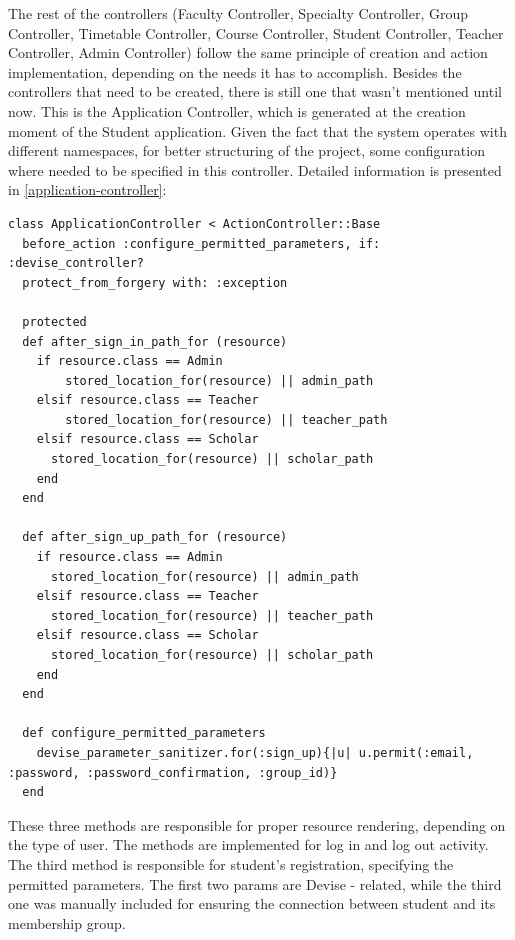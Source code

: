 The rest of the controllers (Faculty Controller, Specialty Controller, Group Controller, Timetable Controller, Course Controller, Student Controller, Teacher Controller, Admin Controller) follow the same principle of creation and action implementation, depending on the needs it has to accomplish. Besides the controllers that need to be created, there is still one that wasn't mentioned until now. This is the Application Controller, which is generated at the creation moment of the Student application. Given the fact that the system operates with different namespaces, for better structuring of the project, some configuration where needed to be specified in this controller. Detailed information is presented in \autoref{application-controller}:

\begin{lstlisting}[caption={Content of Application Controller},label={application-controller}]
class ApplicationController < ActionController::Base
  before_action :configure_permitted_parameters, if: :devise_controller?
  protect_from_forgery with: :exception

  protected
  def after_sign_in_path_for (resource)
  	if resource.class == Admin 
  		stored_location_for(resource) || admin_path
  	elsif resource.class == Teacher
  		stored_location_for(resource) || teacher_path	
    elsif resource.class == Scholar
      stored_location_for(resource) || scholar_path 
    end
  end

  def after_sign_up_path_for (resource)
    if resource.class == Admin 
      stored_location_for(resource) || admin_path
    elsif resource.class == Teacher
      stored_location_for(resource) || teacher_path
    elsif resource.class == Scholar
      stored_location_for(resource) || scholar_path 
    end
  end

  def configure_permitted_parameters
    devise_parameter_sanitizer.for(:sign_up){|u| u.permit(:email, :password, :password_confirmation, :group_id)}
  end
\end{lstlisting}
\bigskip

These three methods are responsible for proper resource rendering, depending on the type of user. The methods are implemented for  log in and log out activity. The third method is responsible for student's registration, specifying the permitted parameters. The first two params are Devise - related, while the third one was manually included for ensuring the connection between student and its membership group.

